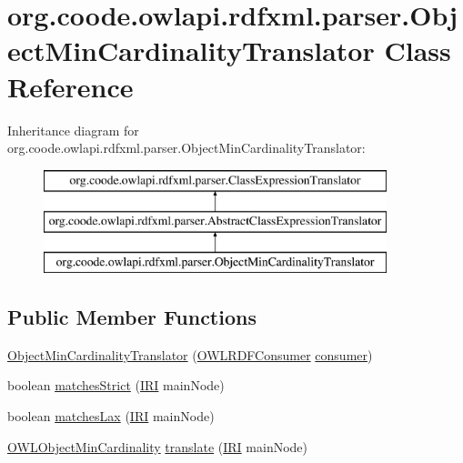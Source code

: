 \hypertarget{classorg_1_1coode_1_1owlapi_1_1rdfxml_1_1parser_1_1_object_min_cardinality_translator}{\section{org.\-coode.\-owlapi.\-rdfxml.\-parser.\-Object\-Min\-Cardinality\-Translator Class Reference}
\label{classorg_1_1coode_1_1owlapi_1_1rdfxml_1_1parser_1_1_object_min_cardinality_translator}
}
Inheritance diagram for org.\-coode.\-owlapi.\-rdfxml.\-parser.\-Object\-Min\-Cardinality\-Translator\-:\begin{figure}[H]
\begin{center}
\leavevmode
\includegraphics[height=3.000000cm]{classorg_1_1coode_1_1owlapi_1_1rdfxml_1_1parser_1_1_object_min_cardinality_translator}
\end{center}
\end{figure}
\subsection*{Public Member Functions}
\begin{DoxyCompactItemize}
\item 
\hyperlink{classorg_1_1coode_1_1owlapi_1_1rdfxml_1_1parser_1_1_object_min_cardinality_translator_a28d17c7c944d25d1a4e95f7d2259e722}{Object\-Min\-Cardinality\-Translator} (\hyperlink{classorg_1_1coode_1_1owlapi_1_1rdfxml_1_1parser_1_1_o_w_l_r_d_f_consumer}{O\-W\-L\-R\-D\-F\-Consumer} \hyperlink{classorg_1_1coode_1_1owlapi_1_1rdfxml_1_1parser_1_1_abstract_class_expression_translator_ae547084cdd5b92c03835b5aa404f823b}{consumer})
\item 
boolean \hyperlink{classorg_1_1coode_1_1owlapi_1_1rdfxml_1_1parser_1_1_object_min_cardinality_translator_aa566de4d12074a2c9763a55475e265ac}{matches\-Strict} (\hyperlink{classorg_1_1semanticweb_1_1owlapi_1_1model_1_1_i_r_i}{I\-R\-I} main\-Node)
\item 
boolean \hyperlink{classorg_1_1coode_1_1owlapi_1_1rdfxml_1_1parser_1_1_object_min_cardinality_translator_a963c6882b2199fa8a03b39ebfedc9409}{matches\-Lax} (\hyperlink{classorg_1_1semanticweb_1_1owlapi_1_1model_1_1_i_r_i}{I\-R\-I} main\-Node)
\item 
\hyperlink{interfaceorg_1_1semanticweb_1_1owlapi_1_1model_1_1_o_w_l_object_min_cardinality}{O\-W\-L\-Object\-Min\-Cardinality} \hyperlink{classorg_1_1coode_1_1owlapi_1_1rdfxml_1_1parser_1_1_object_min_cardinality_translator_a593aff5dc69ac487bdcc6c24ee862599}{translate} (\hyperlink{classorg_1_1semanticweb_1_1owlapi_1_1model_1_1_i_r_i}{I\-R\-I} main\-Node)
\end{DoxyCompactItemize}
